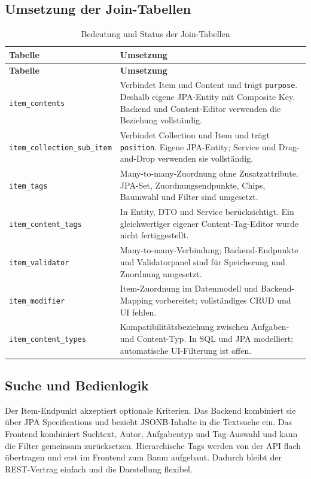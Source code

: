 \documentclass[11pt,a4paper]{article}
\begin{document}
\subsection{Umsetzung der Join-Tabellen}
\begin{longtable}{|p{.24\linewidth}|p{.68\linewidth}|}
\caption{Bedeutung und Status der Join-Tabellen}\label{tab:joins}\\
\hline
\textbf{Tabelle}&\textbf{Umsetzung}\\\hline
\endfirsthead
\hline
\textbf{Tabelle}&\textbf{Umsetzung}\\\hline
\endhead
\texttt{item\_contents}&Verbindet Item und Content und trägt
\texttt{purpose}. Deshalb eigene JPA-Entity mit Composite Key. Backend und
Content-Editor verwenden die Beziehung vollständig.\\
\texttt{item\_\allowbreak collection\_\allowbreak sub\_\allowbreak item}&Verbindet Collection und Item und trägt
\texttt{position}. Eigene JPA-Entity; Service und Drag-and-Drop verwenden sie
vollständig.\\
\texttt{item\_tags}&Many-to-many-Zuordnung ohne Zusatzattribute. JPA-Set,
Zuordnungsendpunkte, Chips, Baumwahl und Filter sind umgesetzt.\\
\texttt{item\_content\_tags}&In Entity, DTO und Service berücksichtigt.
Ein gleichwertiger eigener Content-Tag-Editor wurde nicht fertiggestellt.\\
\texttt{item\_validator}&Many-to-many-Verbindung; Backend-Endpunkte und
Validatorpanel sind für Speicherung und Zuordnung umgesetzt.\\
\texttt{item\_modifier}&Item-Zuordnung im Datenmodell und Backend-Mapping
vorbereitet; vollständiges CRUD und UI fehlen.\\
\texttt{item\_content\_types}&Kompatibilitätsbeziehung zwischen Aufgaben- und
Content-Typ. In SQL und JPA modelliert; automatische UI-Filterung ist offen.\\
\hline
\end{longtable}

\subsection{Suche und Bedienlogik}
Der Item-Endpunkt akzeptiert optionale Kriterien. Das Backend kombiniert sie
über JPA Specifications und bezieht JSONB-Inhalte in die Textsuche ein. Das
Frontend kombiniert Suchtext, Autor, Aufgabentyp und Tag-Auswahl und kann die
Filter gemeinsam zurücksetzen. Hierarchische Tags werden von der API flach
übertragen und erst im Frontend zum Baum aufgebaut. Dadurch bleibt der
REST-Vertrag einfach und die Darstellung flexibel.
\end{document}
